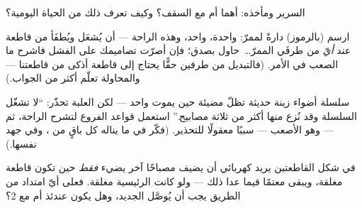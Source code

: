 \begin{exercise}[$\star$]\label{exo:g5:series-parallel-circuits:8}
 السرير ومأخذه: أهما  أم  مع 
السقف؟ وكيف تعرف ذلك من الحياة اليومية؟
\end{exercise}

\begin{exercise}[$\star\star$]\label{exo:g5:series-parallel-circuits:9}
ارسم (بالرموز) دارةً لممرّ:  واحدة،  واحد، وهذه
الراحة --- أن يُشعَل  ويُطفَأ من قاطعة عند \emph{أيّ} من
طرفَي الممرّ\dots\ حاول بصدق؛ فإن أصرّت تصاميمك على الفشل فاشرح
ما الصعب في الأمر. (فالتبديل من طرفين حقًّا يحتاج إلى قاطعة أذكى
من قاطعتنا --- والمحاولة تعلّم أكثر من الجواب.)
\end{exercise}

\begin{exercise}[$\star\star$]\label{exo:g5:series-parallel-circuits:10}
سلسلة أضواء زينة حديثة تظلّ مضيئة حين يموت  واحد --- لكن
العلبة تحذّر: ``لا تشغّل السلسلة وقد نُزع منها أكثر من ثلاثة
مصابيح.'' استعمل قواعد الفروع لتشرح الراحة، ثم --- وهو الأصعب
--- سببًا معقولًا للتحذير. (فكّر في ما يناله كل  باقٍ من
، وفي جهد  نفسها.)
\end{exercise}

\begin{exercise}[$\star\star$]\label{exo:g5:series-parallel-circuits:11}
في شكل القاطعتين يريد كهربائي أن يضيف مصباحًا آخر يضيء
\emph{فقط} حين تكون قاطعة  مغلقة، ويبقى معتمًا فيما عدا
ذلك --- ولو كانت  الرئيسية مغلقة. فعلى أيّ امتداد من
الطريق يجب أن يُوصَّل  الجديد، وهل يكون عندئذ  أم  مع  2؟
\end{exercise}
